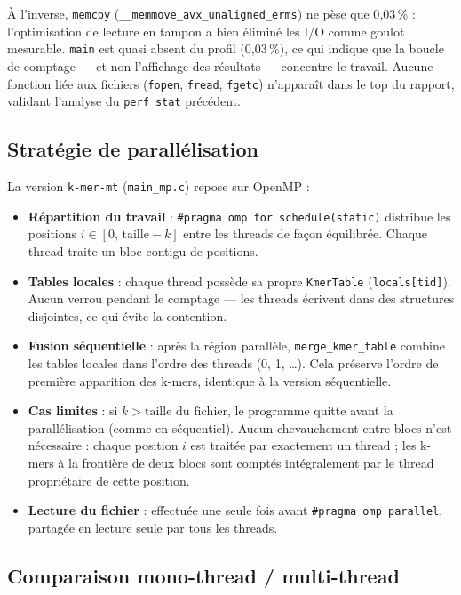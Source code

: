 \documentclass[a4paper,12pt]{article}
\begin{document}
À l'inverse, \texttt{memcpy} (\texttt{\_\_memmove\_avx\_unaligned\_erms}) ne pèse que 0{,}03\,\% : l'optimisation de lecture en tampon a bien éliminé les I/O comme goulot mesurable. \texttt{main} est quasi absent du profil (0{,}03\,\%), ce qui indique que la boucle de comptage --- et non l'affichage des résultats --- concentre le travail. Aucune fonction liée aux fichiers (\texttt{fopen}, \texttt{fread}, \texttt{fgetc}) n'apparaît dans le top du rapport, validant l'analyse du \texttt{perf stat} précédent.

\newpage

\subsection{Stratégie de parallélisation}

La version \texttt{k-mer-mt} (\texttt{main\_mp.c}) repose sur OpenMP :

\begin{itemize}
    \item \textbf{Répartition du travail} : \texttt{\#pragma omp for schedule(static)} distribue les positions $i \in [0,\, \text{taille} - k]$ entre les threads de façon équilibrée. Chaque thread traite un bloc contigu de positions.
    \item \textbf{Tables locales} : chaque thread possède sa propre \texttt{KmerTable} (\texttt{locals[tid]}). Aucun verrou pendant le comptage --- les threads écrivent dans des structures disjointes, ce qui évite la contention.
    \item \textbf{Fusion séquentielle} : après la région parallèle, \texttt{merge\_kmer\_table} combine les tables locales dans l'ordre des threads (0, 1, \ldots). Cela préserve l'ordre de première apparition des k-mers, identique à la version séquentielle.
    \item \textbf{Cas limites} : si $k > \text{taille du fichier}$, le programme quitte avant la parallélisation (comme en séquentiel). Aucun chevauchement entre blocs n'est nécessaire : chaque position $i$ est traitée par exactement un thread ; les k-mers à la frontière de deux blocs sont comptés intégralement par le thread propriétaire de cette position.
    \item \textbf{Lecture du fichier} : effectuée une seule fois avant \texttt{\#pragma omp parallel}, partagée en lecture seule par tous les threads.
\end{itemize}

\subsection{Comparaison mono-thread / multi-thread}
\end{document}
